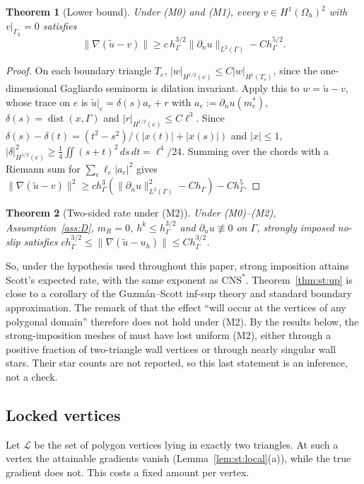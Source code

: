 \documentclass[pdflatex,sn-mathphys-num]{sn-jnl}
\theoremstyle{thmstyleone}
\newtheorem{theorem}{Theorem}[section]
\theoremstyle{thmstylethree}
\newcommand{\hG}{h_\Gamma}
\newcommand{\Gh}{\Gamma_h}
\newcommand{\Oh}{\Omega_h}
\newcommand{\dn}{\partial_n}
\newcommand{\ut}{\tilde u}
\newcommand{\norm}[1]{\lVert #1\rVert}
\newcommand{\CNS}{\mathrm{CNS}^\ast}
\newcommand{\Lk}{\mathcal L}
\DeclareMathOperator{\dist}{dist}
\begin{document}
\begin{theorem}[Lower bound]\label{thm:st:low}
Under (M0) and (M1), every $v\in H^1(\Oh)^2$ with $v|_{\Gh}=0$ satisfies
\[
\norm{\nabla(\ut-v)}\ge c\,\hG^{3/2}\norm{\dn u}_{L^2(\Gamma)}-C\hG^{5/2}.
\]
\end{theorem}

\begin{proof}
On each boundary triangle $T_e$, $|w|_{H^{1/2}(e)}\le C|w|_{H^1(T_e)}$, since the one-dimensional Gagliardo seminorm is dilation invariant. Apply this to $w=\ut-v$, whose trace on $e$ is $\ut|_e=\delta(s)a_e+r$ with $a_e:=\dn u(m_e^\ast)$, $\delta(s)=\dist(x,\Gamma)$ and $|r|_{H^{1/2}(e)}\le C\ell^3$. Since $\delta(s)-\delta(t)=(t^2-s^2)/(|x(t)|+|x(s)|)$ and $|x|\le1$, $|\delta|^2_{H^{1/2}(e)}\ge\frac14\iint(s+t)^2\,ds\,dt=\ell^4/24$. Summing over the chords with a Riemann sum for $\sum_e\ell_e|a_e|^2$ gives $\norm{\nabla(\ut-v)}^2\ge c\hG^3(\norm{\dn u}^2_{L^2(\Gamma)}-C\hG)-C\hG^5$.
\end{proof}

\begin{theorem}[Two-sided rate under (M2)]\label{thm:st:two}
Under (M0)--(M2), Assumption~\ref{ass:D}, $m_R=0$, $h^k\le\hG^{3/2}$ and $\dn u\not\equiv0$ on $\Gamma$, strongly imposed no-slip satisfies $c\hG^{3/2}\le\norm{\nabla(\ut-u_h)}\le C\hG^{3/2}$.
\end{theorem}

So, under the hypothesis used throughout this paper, strong imposition attains Scott's expected rate, with the same exponent as $\CNS$. Theorem~\ref{thm:st:up} is close to a corollary of the Guzm\'an--Scott inf-sup theory and standard boundary approximation. The remark of \cite{GjerdeScott2024} that the effect ``will occur at the vertices of any polygonal domain'' therefore does not hold under (M2). By the results below, the strong-imposition meshes of \cite{GjerdeScott2024} must have lost uniform (M2), either through a positive fraction of two-triangle wall vertices or through nearly singular wall stars. Their star counts are not reported, so this last statement is an inference, not a check.

\subsection{Locked vertices}
Let $\Lk$ be the set of polygon vertices lying in exactly two triangles. At such a vertex the attainable gradients vanish (Lemma~\ref{lem:st:local}(a)), while the true gradient does not. This costs a fixed amount per vertex.
\end{document}
